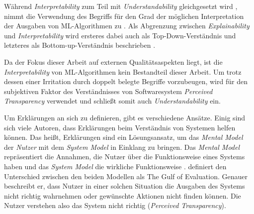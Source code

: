 Während \textit{Interpretability} zum Teil mit \textit{Understandability} gleichgesetzt wird \cite{chazette_end-users_nodate}, nimmt die Verwendung des Begriffs für den Grad der möglichen Interpretation der Ausgaben von ML-Algorithmen zu \cite{doshi2017towards}. Als Abgrenzung zwischen \textit{Explainability} und \textit{Interpretability} wird ersteres dabei auch als \glqq Top-Down\grqq{}-Verständnis und letzteres als \glqq Bottom-up\grqq{}-Verständnis beschrieben \cite{thomson_knowledge--information_2020}.

Da der Fokus dieser Arbeit auf externen Qualitätsaspekten liegt, ist die \textit{Interpretability} von ML-Algorithmen kein Bestandteil dieser Arbeit. Um trotz dessen einer Irritation durch doppelt belegte Begriffe vorzubeugen, wird für den subjektiven Faktor des Verständnisses von Softwaresystem \textit{Perceived Transparency} verwendet und schließt somit auch \textit{Understandability} ein.

\bigskip

Um Erklärungen an sich zu definieren, gibt es verschiedene Ansätze. Einig sind sich viele Autoren, dass Erklärungen beim Verständnis von Systemen helfen können. Das heißt, Erklärungen sind ein Lösungsansatz, um das \textit{Mental Model} der \textit{Nutzer} mit dem \textit{System Model} in Einklang zu bringen. Das \textit{Mental Model} repräsentiert die Annahmen, die Nutzer über die Funktionsweise eines Systems haben und das \textit{System Model} die wirkliche Funktionsweise \cite{chi_three_nodate}. \citeauthor{norman1988psychology} definiert den Unterschied zwischen den beiden Modellen als \glqq The Gulf of Evaluation\grqq \cite{norman1988psychology}. Genauer beschreibt er, dass Nutzer in einer solchen Situation die Ausgaben des Systems nicht richtig wahrnehmen oder gewünschte Aktionen nicht finden können. Die Nutzer verstehen also das System nicht richtig (\textit{Perceived Transparency}).

